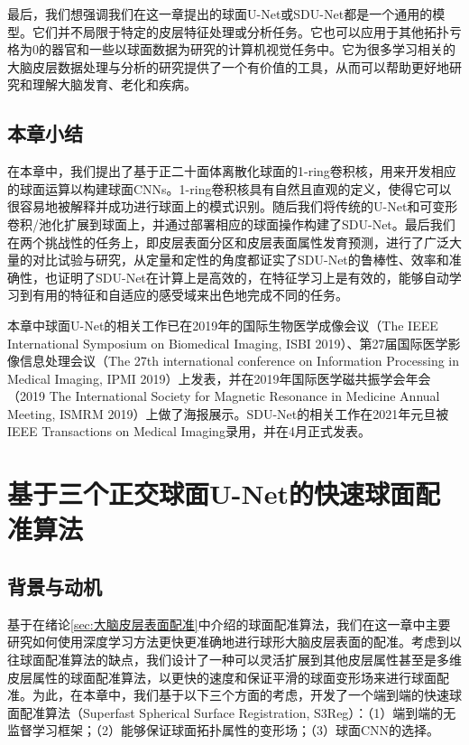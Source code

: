 最后，我们想强调我们在这一章提出的球面U-Net或SDU-Net都是一个通用的模型。它们并不局限于特定的皮层特征处理或分析任务。它也可以应用于其他拓扑亏格为0的器官和一些以球面数据为研究的计算机视觉任务中。它为很多学习相关的大脑皮层数据处理与分析的研究提供了一个有价值的工具，从而可以帮助更好地研究和理解大脑发育、老化和疾病。

\section{本章小结}
在本章中，我们提出了基于正二十面体离散化球面的1-ring卷积核，用来开发相应的球面运算以构建球面CNNs。1-ring卷积核具有自然且直观的定义，使得它可以很容易地被解释并成功进行球面上的模式识别。随后我们将传统的U-Net和可变形卷积/池化扩展到球面上，并通过部署相应的球面操作构建了SDU-Net。最后我们在两个挑战性的任务上，即皮层表面分区和皮层表面属性发育预测，进行了广泛大量的对比试验与研究，从定量和定性的角度都证实了SDU-Net的鲁棒性、效率和准确性，也证明了SDU-Net在计算上是高效的，在特征学习上是有效的，能够自动学习到有用的特征和自适应的感受域来出色地完成不同的任务。

本章中球面U-Net的相关工作已在2019年的国际生物医学成像会议（The IEEE International Symposium on Biomedical Imaging, ISBI 2019）、第27届国际医学影像信息处理会议（The 27th international conference on Information Processing in Medical Imaging, IPMI 2019）上发表，并在2019年国际医学磁共振学会年会（2019 The International Society for Magnetic Resonance in Medicine Annual Meeting, ISMRM 2019）上做了海报展示。SDU-Net的相关工作在2021年元旦被IEEE Transactions on Medical Imaging录用，并在4月正式发表。








\chapter{基于三个正交球面U-Net的快速球面配准算法}\label{sec:基于三个正交球面U-Net的快速球面配准算法}

\section{背景与动机}
基于在绪论\ref{sec:大脑皮层表面配准}中介绍的球面配准算法，我们在这一章中主要研究如何使用深度学习方法更快更准确地进行球形大脑皮层表面的配准。考虑到以往球面配准算法的缺点，我们设计了一种可以灵活扩展到其他皮层属性甚至是多维皮层属性的球面配准算法，以更快的速度和保证平滑的球面变形场来进行球面配准。为此，在本章中，我们基于以下三个方面的考虑，开发了一个端到端的快速球面配准算法（Superfast Spherical Surface Registration, S3Reg）：（1）端到端的无监督学习框架；（2）能够保证球面拓扑属性的变形场；（3）球面CNN的选择。

